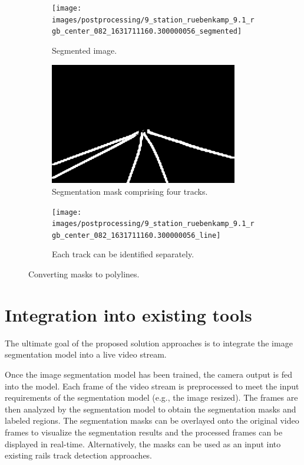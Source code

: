 \documentclass[Master,MDS,english]{BASE/twbook} %
\begin{document}
\begin{figure}[H]
\centering
\begin{subfigure}[t]{.33\textwidth}
  \centering
  \texttt{[image: images/postprocessing/9\_station\_ruebenkamp\_9.1\_rgb\_center\_082\_1631711160.300000056\_segmented]}
  \caption{Segmented image.}
\end{subfigure}%
\begin{subfigure}[t]{.33\textwidth}
  \centering
  \includegraphics[width=0.9\textwidth]{images/postprocessing/9_station_ruebenkamp_9.1_rgb_center_082_1631711160.300000056_mask}
  \caption{Segmentation mask comprising four tracks.}
\end{subfigure}%
\begin{subfigure}[t]{.33\textwidth}
  \centering
  \texttt{[image: images/postprocessing/9\_station\_ruebenkamp\_9.1\_rgb\_center\_082\_1631711160.300000056\_line]}
  \caption{Each track can be identified separately. }
\end{subfigure}
\caption{Converting masks to polylines. }
\label{fig:postprocessing1}
\end{figure}




\section{Integration into existing tools}

The ultimate goal of the proposed solution approaches is to integrate the image segmentation model into a live video stream.

Once the image segmentation model has been trained, the camera output is fed into the model. Each frame of the video stream is preprocessed to meet the input requirements of the segmentation model (e.g., the image resized). The frames are then analyzed by the segmentation model to obtain the segmentation masks and labeled regions. 
The segmentation masks can be overlayed onto the original video frames to visualize the segmentation results and the processed frames can be displayed in real-time. Alternatively, the masks can be used as an input into existing rails track detection approaches.
\end{document}
